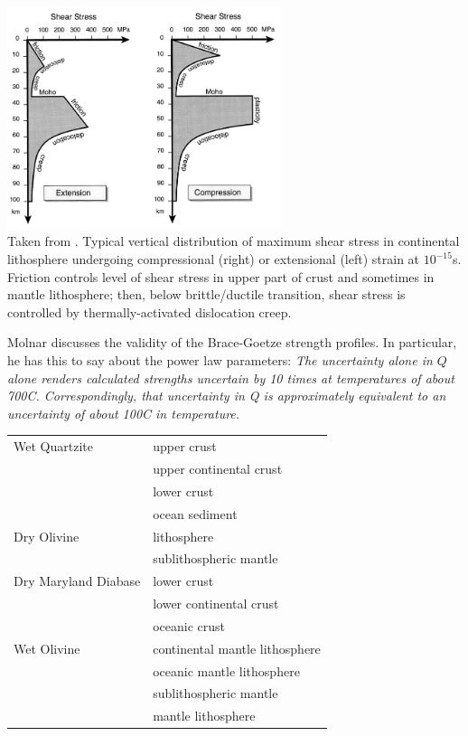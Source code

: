 \begin{center}
\includegraphics[width=8cm]{images/rheology/bird99}\\
{\captionfont Taken from \cite{bird99}.
Typical vertical distribution of maximum shear stress in continental lithosphere 
undergoing compressional (right) or extensional (left) strain at $10^{-15}$s. 
Friction controls level of shear stress in upper part of crust and sometimes in mantle lithosphere;
then, below brittle/ductile transition, shear stress is controlled by thermally-activated dislocation creep.}
\end{center}

Molnar \cite{moln92} discusses the validity of the Brace-Goetze strength profiles. 
In particular, he has this to say about the power law parameters:
{\it
The uncertainty alone in $Q$ alone renders calculated strengths 
uncertain by 10 times at temperatures of about 700C.
Correspondingly, that uncertainty in Q is approximately equivalent 
to an uncertainty of about 100C in temperature.
}


\begin{center}
\begin{tabular}{l|l}
\hline

Wet Quartzite & upper crust  \cite{jahu12,wabj08} \\
              & upper continental crust \cite{kecw09,cube11} \\
              & lower crust  \cite{jahu12,wabj08} \\
              & ocean sediment \cite{kecw09} \\
Dry Olivine   & lithosphere  \cite{hube07}\\
              & sublithospheric mantle \cite{hube07}\\
Dry Maryland Diabase & lower crust \cite{wabj08,wabj08b} \\
                     & lower continental crust \cite{kecw09,cube11} \\
                     & oceanic crust \cite{wabj08,kecw09,wabj08b,cube11} \\
Wet Olivine   & continental mantle lithosphere \cite{wabj08,wabj08b} \\
              & oceanic mantle lithosphere \cite{wabj08,wabj08b} \\
              & sublithospheric mantle \cite{wabj08,kecw09,wabj08b} \\
              & mantle lithosphere \cite{kecw09} \\
\hline
\end{tabular}
\end{center}



